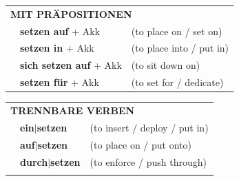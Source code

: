 \documentclass[10pt,a4paper]{revtex4-2}
\begin{document}
\begin{verbbox}
 \vspace{10pt}

\begin{tabular}{lll}
      \multicolumn{3}{l}{\textbf{MIT PRÄPOSITIONEN}}\\
& \textbf{setzen auf} + Akk & (to place on / set on)\\
& \textbf{setzen in} + Akk & (to place into / put in)\\
& \textbf{sich setzen auf} + Akk & (to sit down on)\\
& \textbf{setzen für} + Akk & (to set for / dedicate)\\
\end{tabular}
  \hfill
\begin{tabular}{lll}
      \multicolumn{3}{l}{\textbf{TRENNBARE VERBEN}}\\
 & \textbf{ein$|$setzen} & (to insert / deploy / put in)\\
 & \textbf{auf$|$setzen} & (to place on / put onto)\\
 & \textbf{durch$|$setzen} & (to enforce / push through)\\
\vspace{10pt}
  \end{tabular}


\vspace{-5pt}
\end{verbbox}
\end{document}
